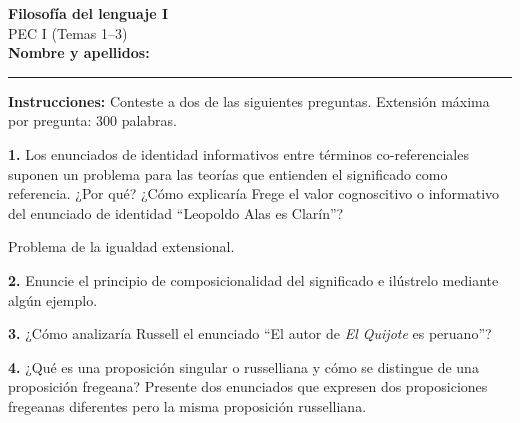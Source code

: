 \documentclass[12pt,a4paper]{article}
\begin{document}
\begin{center}
    \Large \textbf{Filosofía del lenguaje I}\\[0.3cm]
    \large PEC I (Temas 1--3)\\[0.5cm]
    \normalsize \textbf{Nombre y apellidos:} \rule{10cm}{0.4pt}
\end{center}

\vspace{1cm}

\noindent
\textbf{Instrucciones:} Conteste a dos de las siguientes preguntas. Extensión máxima por pregunta: 300 palabras.

\vspace{1cm}

\noindent\textbf{1.} Los enunciados de identidad informativos entre términos co-referenciales suponen un problema para las teorías que entienden el significado como referencia. ¿Por qué? ¿Cómo explicaría Frege el valor cognoscitivo o informativo del enunciado de identidad ``Leopoldo Alas es Clarín''?

\vspace{1cm}

Problema de la igualdad extensional.

\vspace{2cm}

\noindent\textbf{2.} Enuncie el principio de composicionalidad del significado e ilústrelo mediante algún ejemplo.

\vspace{2cm}

\noindent\textbf{3.} ¿Cómo analizaría Russell el enunciado ``El autor de \textit{El Quijote} es peruano''?

\vspace{2cm}

\noindent\textbf{4.} ¿Qué es una proposición singular o russelliana y cómo se distingue de una proposición fregeana? Presente dos enunciados que expresen dos proposiciones fregeanas diferentes pero la misma proposición russelliana.

\vspace{2cm}
\end{document}
